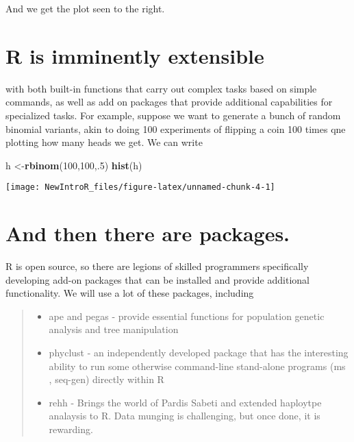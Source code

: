 \documentclass[]{tufte-book}
\newenvironment{Shaded}{}{}
\newcommand{\KeywordTok}[1]{\textcolor[rgb]{0.00,0.44,0.13}{\textbf{#1}}}
\newcommand{\DecValTok}[1]{\textcolor[rgb]{0.25,0.63,0.44}{#1}}
\newcommand{\NormalTok}[1]{#1}
\providecommand{\tightlist}{%
  \setlength{\itemsep}{0pt}\setlength{\parskip}{0pt}}
\begin{document}
And we get the plot seen to the right.

\section{R is imminently extensible}\label{r-is-imminently-extensible}

with both built-in functions that carry out complex tasks based on
simple commands, as well as add on packages that provide additional
capabilities for specialized tasks. For example, suppose we want to
generate a bunch of random binomial variants, akin to doing 100
experiments of flipping a coin 100 times qne plotting how many heads we
get. We can write

\begin{Shaded}
\begin{Highlighting}[]
\NormalTok{h <-}\KeywordTok{rbinom}\NormalTok{(}\DecValTok{100}\NormalTok{,}\DecValTok{100}\NormalTok{,.}\DecValTok{5}\NormalTok{)}
\KeywordTok{hist}\NormalTok{(h)}
\end{Highlighting}
\end{Shaded}

\begin{marginfigure}
\texttt{[image: NewIntroR\_files/figure-latex/unnamed-chunk-4-1]} \end{marginfigure}

\section{And then there are
packages.}\label{and-then-there-are-packages.}

R is open source, so there are legions of skilled programmers
specifically developing add-on packages that can be installed and
provide additional functionality. We will use a lot of these packages,
including

\begin{quote}
\begin{itemize}
\tightlist
\item
  ape \citep{Paradis2004} and pegas \citep{Paradis2010} - provide
  essential functions for population genetic analysis and tree
  manipulation
\item
  phyclust \citep{Phyclust} - an independently developed package that
  has the interesting ability to run some otherwise command-line
  stand-alone programs (ms \citep{ms}, seq-gen) directly within R
\item
  rehh \citep{rehh} - Brings the world of Pardis Sabeti and extended
  haploytpe analaysis to R. Data munging is challenging, but once done,
  it is rewarding.
\end{itemize}
\end{quote}
\end{document}
